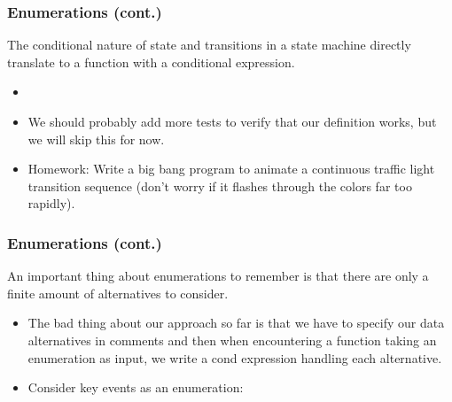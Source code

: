 \documentclass{beamer}
\begin{document}

\begin{frame}
  \frametitle{Enumerations (cont.)}
  The conditional nature of state and transitions in a state machine
  directly translate to a function with a conditional expression.
  \begin{itemize}
  \item<2-> \trafficTransition
  \item<3-> We should probably add more tests to verify that our definition
    works, but we will skip this for now.
  \item<4-> Homework: Write a big bang program to animate a continuous
    traffic light transition sequence (don't worry if it flashes through the
    colors far too rapidly).
  \end{itemize}
\end{frame}




\begin{frame}
  \frametitle{Enumerations (cont.)}
  An important thing about enumerations to remember is that there are
  only a finite amount of alternatives to consider. 
  \begin{itemize}
  \item<2-> The bad thing about our approach so far is that
    we have to specify our data alternatives in comments and then
    when encountering a function taking an enumeration as input, we
    write a cond expression handling each alternative.
  \item<3-> Consider key events as an enumeration:
    \keyEnum
  \end{itemize}
\end{frame}

\end{document}
